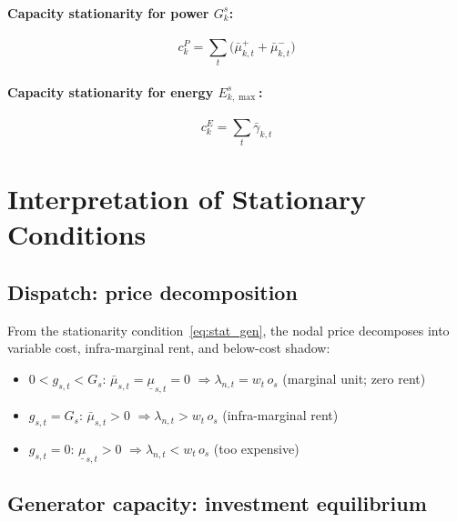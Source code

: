 \documentclass{article}
\begin{document}
\paragraph{Capacity stationarity for power $G^s_k$:}
\begin{equation}
    c^P_k = \sum_t \bigl(\bar{\mu}^+_{k,t} + \bar{\mu}^-_{k,t}\bigr)
    \label{eq:cap_stat_power}
\end{equation}

\paragraph{Capacity stationarity for energy $E^s_{k,\max}$:}
\begin{equation}
    c^E_k = \sum_t \bar{\gamma}_{k,t}
    \label{eq:cap_stat_energy}
\end{equation}

\section{Interpretation of Stationary Conditions}
\label{sec:stationary}

\subsection{Dispatch: price decomposition}

From the stationarity condition~\eqref{eq:stat_gen}, the nodal price decomposes
into variable cost, infra-marginal rent, and below-cost shadow:

\begin{itemize}
    \item $0 < g_{s,t} < G_s$: $\bar{\mu}_{s,t} = \underline{\mu}_{s,t} = 0$
          $\Rightarrow \lambda_{n,t} = w_t\, o_s$ \quad (marginal unit; zero rent)
    \item $g_{s,t} = G_s$: $\bar{\mu}_{s,t} > 0$
          $\Rightarrow \lambda_{n,t} > w_t\, o_s$ \quad (infra-marginal rent)
    \item $g_{s,t} = 0$: $\underline{\mu}_{s,t} > 0$
          $\Rightarrow \lambda_{n,t} < w_t\, o_s$ \quad (too expensive)
\end{itemize}

\subsection{Generator capacity: investment equilibrium}
\end{document}
